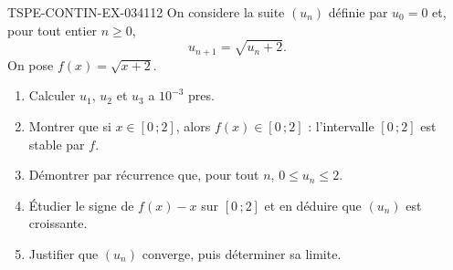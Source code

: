 \begin{exercice}{TSPE-CONTIN-EX-034}{1}{12}
On considere la suite $(u_n)$ définie par $u_0 = 0$ et, pour tout entier $n \geq 0$,
\[ u_{n+1} = \sqrt{u_n + 2}. \]
On pose $f(x) = \sqrt{x+2}$.
\begin{enumerate}
  \item Calculer $u_1$, $u_2$ et $u_3$ a $10^{-3}$ pres.
  \item Montrer que si $x \in [0\,;2]$, alors $f(x) \in [0\,;2]$ : l'intervalle $[0\,;2]$ est stable par $f$.
  \item Démontrer par récurrence que, pour tout $n$, $0 \leq u_n \leq 2$.
  \item Étudier le signe de $f(x) - x$ sur $[0\,;2]$ et en déduire que $(u_n)$ est croissante.
  \item Justifier que $(u_n)$ converge, puis déterminer sa limite.
\end{enumerate}
\end{exercice}
